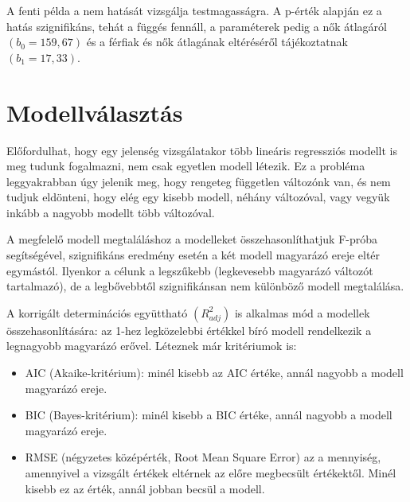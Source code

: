 \documentclass[
  letterpaper,
]{krantz}
\providecommand{\tightlist}{%
  \setlength{\itemsep}{0pt}\setlength{\parskip}{0pt}}\usepackage{longtable,booktabs,array}
\begin{document}
A fenti példa a nem hatását vizsgálja testmagasságra. A p-érték alapján
ez a hatás szignifikáns, tehát a függés fennáll, a paraméterek pedig a
nők átlagáról \((b_0=159,67)\) és a férfiak és nők átlagának eltéréséről
tájékoztatnak \((b_1=17,33)\).

\hypertarget{modellvuxe1lasztuxe1s}{%
\section{Modellválasztás}\label{modellvuxe1lasztuxe1s}}

Előfordulhat, hogy egy jelenség vizsgálatakor több lineáris regressziós
modellt is meg tudunk fogalmazni, nem csak egyetlen modell létezik. Ez a
probléma leggyakrabban úgy jelenik meg, hogy rengeteg független
változónk van, és nem tudjuk eldönteni, hogy elég egy kisebb modell,
néhány változóval, vagy vegyük inkább a nagyobb modellt több változóval.

A megfelelő modell megtaláláshoz a modelleket összehasonlíthatjuk
F-próba segítségével, szignifikáns eredmény esetén a két modell
magyarázó ereje eltér egymástól. Ilyenkor a célunk a legszűkebb
(legkevesebb magyarázó változót tartalmazó), de a legbővebbtől
szignifikánsan nem különböző modell megtalálása.

A korrigált determinációs együttható \((R_{adj}^2)\) is alkalmas mód a
modellek összehasonlítására: az 1-hez legközelebbi értékkel bíró modell
rendelkezik a legnagyobb magyarázó erővel. Léteznek már kritériumok is:

\begin{itemize}
\tightlist
\item
  AIC (Akaike-kritérium): minél kisebb az AIC értéke, annál nagyobb a
  modell magyarázó ereje.
\item
  BIC (Bayes-kritérium): minél kisebb a BIC értéke, annál nagyobb a
  modell magyarázó ereje.
\item
  RMSE (négyzetes középérték, Root Mean Square Error) az a mennyiség,
  amennyivel a vizsgált értékek eltérnek az előre megbecsült értékektől.
  Minél kisebb ez az érték, annál jobban becsül a modell.
\end{itemize}
\end{document}
